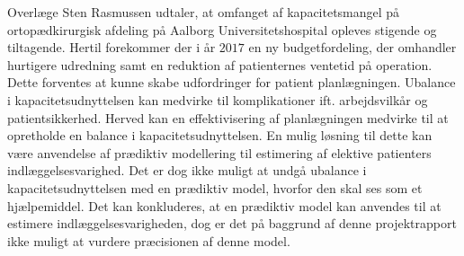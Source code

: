 Overlæge Sten Rasmussen udtaler, at omfanget af kapacitetsmangel på ortopædkirurgisk afdeling på Aalborg Universitetshospital opleves stigende og tiltagende. Hertil forekommer der i år $2017$ en ny budgetfordeling, der omhandler hurtigere udredning samt en reduktion af patienternes ventetid på operation. Dette forventes at kunne skabe udfordringer for patient planlægningen. Ubalance i kapacitetsudnyttelsen kan medvirke til komplikationer ift. arbejdsvilkår og patientsikkerhed. Herved kan en effektivisering af planlægningen medvirke til at opretholde en balance i kapacitetsudnyttelsen. En mulig løsning til dette kan være anvendelse af prædiktiv modellering til estimering af elektive patienters indlæggelsesvarighed. Det er dog ikke muligt at undgå ubalance i kapacitetsudnyttelsen med en prædiktiv model, hvorfor den skal ses som et hjælpemiddel. Det kan konkluderes, at en prædiktiv model kan anvendes til at estimere indlæggelsesvarigheden, dog er det på baggrund af denne projektrapport ikke muligt at vurdere præcisionen af denne model. 
